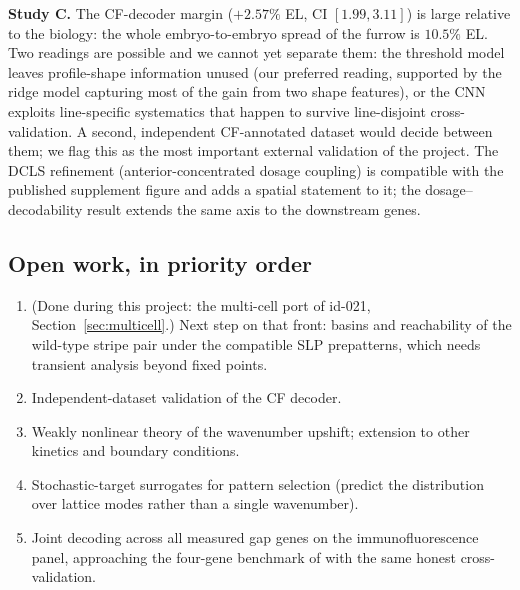 \textbf{Study C.} The CF-decoder margin ($+2.57\%$ EL, CI $[1.99, 3.11]$)
is large relative to the biology: the whole embryo-to-embryo spread of the
furrow is $10.5\%$ EL. Two readings are possible and we cannot yet separate
them: the threshold model leaves profile-shape information unused (our
preferred reading, supported by the ridge model capturing most of the gain
from two shape features), or the CNN exploits line-specific systematics that
happen to survive line-disjoint cross-validation. A second, independent
CF-annotated dataset would decide between them; we flag this as the most
important external validation of the project. The DCLS refinement
(anterior-concentrated dosage coupling) is compatible with the published
supplement figure and adds a spatial statement to it; the
dosage--decodability result extends the same axis to the downstream genes.

\subsection{Open work, in priority order}

\begin{enumerate}
\item (Done during this project: the multi-cell port of id-021,
Section~\ref{sec:multicell}.) Next step on that front: basins and
reachability of the wild-type stripe pair under the compatible SLP
prepatterns, which needs transient analysis beyond fixed points.
\item Independent-dataset validation of the CF decoder.
\item Weakly nonlinear theory of the wavenumber upshift; extension to other
kinetics and boundary conditions.
\item Stochastic-target surrogates for pattern selection (predict the
distribution over lattice modes rather than a single wavenumber).
\item Joint decoding across all measured gap genes on the immunofluorescence
panel, approaching the four-gene benchmark of \cite{petkova2019} with the
same honest cross-validation.
\end{enumerate}
